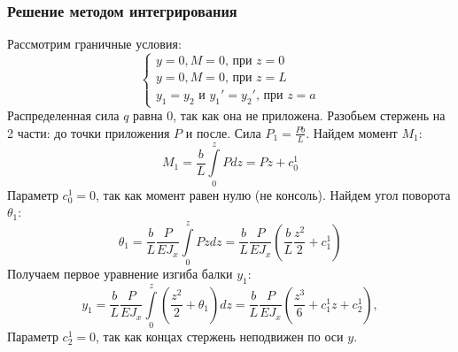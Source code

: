 \documentclass[12pt, a4paper]{article}
\begin{document}
\subsubsection{Решение методом интегрирования}

Рассмотрим граничные условия:
\begin{equation}
	\label{diffbsec}
	\begin{cases}
				y = 0, M = 0 \mbox{, при } z = 0\\
		y = 0, M = 0 \mbox{, при } z = L\\
		y_1 = y_2 \mbox{ и } y_1' = y_2' \mbox{, при } z = a
	\end{cases}
\end{equation}
Распределенная сила $q$ равна  0, так как она не приложена. Разобьем стержень на 2 части: до точки приложения $P$ и после. Сила $P_1 = \frac{P b}{L} $. 
Найдем момент $M_1$:
\[
		M_1 = \frac{b}{L} \int\limits_0^z P d z = P z + c_0^1 
\]
Параметр $c_0^1 = 0$, так как момент равен нулю (не консоль).
Найдем угол поворота $\theta_1$:
\[
	\theta_1 = \frac{b}{L} \frac{P}{E J_{x}} \int\limits_0^z P z d z = \frac{b}{L} \frac{P}{E J_{x}} \left(\frac{b}{L} \frac{z^2}{2} + c_1^1\right)
\]
Получаем первое уравнение изгиба балки $y_1$: 
\begin{equation}
	\label{zeq1}
	y_1 = \frac{b}{L} \frac{P}{E J_{x}} \int\limits_0^z \left(\frac{z^2}{2} + \theta_1\right) dz =  \frac{b}{L} \frac{P}{E J_{x}} \left(\frac{z^3}{6} + c_1^1 z + c_2^1\right),
\end{equation}
Параметр $c_2^1 = 0$, так как концах стержень неподвижен по оси $y$. 
\end{document}
